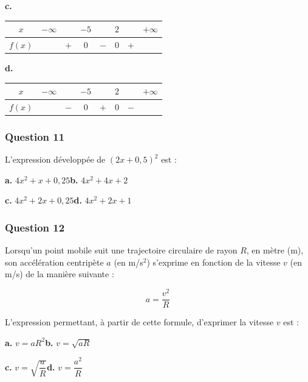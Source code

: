 \documentclass[10pt]{article}
\begin{document}
\textbf{c.} 
\begin{tabular}{|c|ccccccc|}
\hline
$x$ & $-\infty$ & & $-5$ & & $2$ & & $+\infty$ \\
\hline
$f(x)$ & & $+$ & $0$ & $-$ & $0$ & $+$ &\\
\hline
\end{tabular}
\hfill 
\textbf{d.} 
\begin{tabular}{|c|ccccccc|}
\hline
$x$ & $-\infty$ & & $-5$ & & $2$ & & $+\infty$ \\
\hline
$f(x)$ & & $-$ & $0$ & $+$ & $0$ & $-$ &\\
\hline
\end{tabular}

\subsubsection*{Question 11}
L'expression développée de $(2x + 0,5)^2$ est :

\textbf{a.} $4x^2 + x + 0,25$\hfill \textbf{b.} $4x^2 + 4x + 2$

\textbf{c.} $4x^2 + 2x + 0,25$\hfill \textbf{d.} $4x^2 + 2x + 1$

\subsubsection*{Question 12}
Lorsqu'un point mobile suit une trajectoire circulaire de rayon $R$, en mètre (m), son accélération centripète $a$ (en m/s$^2$) s'exprime en fonction de la vitesse $v$ (en m/s) de la manière suivante :

\[a = \dfrac{v^2}{R}\]

L'expression permettant, à partir de cette formule, d'exprimer la vitesse $v$ est :

\textbf{a.} $v = aR^2$\hfill \textbf{b.} $v = \sqrt{aR}$

\textbf{c.} $v = \sqrt{\dfrac{a}{R}}$\hfill \textbf{d.} $v = \dfrac{a^2}{R}$
\end{document}
